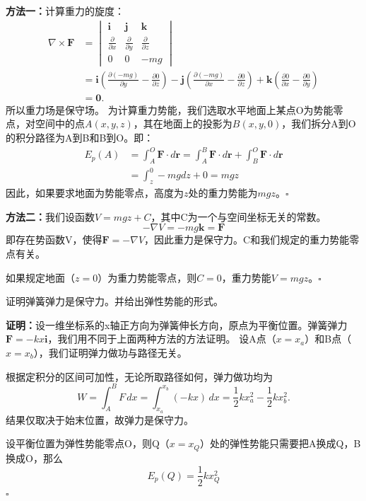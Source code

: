 \documentclass[UTF-8]{ctexart}
\begin{document}
\textbf{方法一：}计算重力的旋度：
\[
\begin{aligned}
\nabla \times \mathbf{F}& = 
\begin{vmatrix}
\mathbf{i} & \mathbf{j} & \mathbf{k} \\
\frac{\partial}{\partial x} & \frac{\partial}{\partial y} & \frac{\partial}{\partial z} \\
0 & 0 & -mg
\end{vmatrix}
\\&= \mathbf{i}\left(\frac{\partial (-mg)}{\partial y} - \frac{\partial 0}{\partial z}\right) - \mathbf{j}\left(\frac{\partial (-mg)}{\partial x} - \frac{\partial 0}{\partial z}\right) + \mathbf{k}\left(\frac{\partial 0}{\partial x} - \frac{\partial 0}{\partial y}\right)\\& = \mathbf{0}.
\end{aligned}
\]
所以重力场是保守场。
为计算重力势能，我们选取水平地面上某点O为势能零点，对空间中的点$A(x,y,z)$，其在地面上的投影为$B(x,y,0)$，我们拆分A到O的积分路径为A到B和B到O。即：
\[
\begin {aligned}
E_p(A) &=  \int_{A}^{O}  \mathbf{F}\cdot d\mathbf{r} = \int_{A}^{B}  \mathbf{F}\cdot d\mathbf{r} + \int_{B}^{O}  \mathbf{F}\cdot d\mathbf{r} 
\\&= \int_{z}^{0} -mg dz + 0 = mgz
\end{aligned}
\]
因此，如果要求地面为势能零点，高度为$z$处的重力势能为$mgz$。\hfill$\square$

\textbf{方法二：}我们设函数$V = mgz +C$，其中C为一个与空间坐标无关的常数。
\[
-\nabla V = -mg \mathbf{k} = \mathbf{F}
\]
即存在势函数V，使得$  \mathbf{F} = -\nabla V $，因此重力是保守力。C和我们规定的重力势能零点有关。

如果规定地面（$z=0$）为重力势能零点，则$C = 0$，重力势能$V = mgz$。\hfill$\square$
\begin{tcolorbox}[colback=white!5!white,colframe=green!50!black,title=弹簧弹力]
证明弹簧弹力是保守力。并给出弹性势能的形式。
\end{tcolorbox}
\noindent \textbf{证明：}设一维坐标系的x轴正方向为弹簧伸长方向，原点为平衡位置。弹簧弹力$\mathbf{F} = -kx \mathbf{i}$，我们用不同于上面两种方法的方法证明。
设A点（$x = x_a$）和B点（$x = x_b$），我们证明弹力做功与路径无关。

根据定积分的区间可加性，无论所取路径如何，弹力做功均为
\[
W = \int_{A}^{B} F\,dx = \int_{x_a}^{x_b} (-kx)\,dx = \frac{1}{2}k x_a^2 - \frac{1}{2}k x_b^2.
\]
结果仅取决于始末位置，故弹力是保守力。 

设平衡位置为弹性势能零点O，则Q（$x = x_Q$）处的弹性势能只需要把A换成Q，B换成O，那么
\[
E_p(Q ) =  \frac{1}{2}k x_Q^2 
\]
\hfill$\square$
\end{document}

